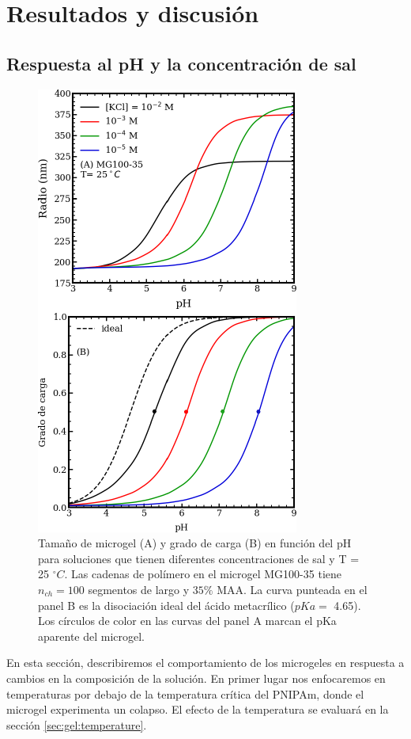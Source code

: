 \section{Resultados y discusi\'on}



\subsection{Respuesta al pH y la concentraci\'on de sal}\label{sec:gel:pH_salt}


\begin{figure}[!ht]
\centering
\includegraphics[width=0.40\linewidth]{Figures/graph-gel/R-pH.pdf}
\caption{Tama\~no de microgel (A) y grado de carga (B) en funci\'on del pH para soluciones que tienen diferentes concentraciones de sal y T = 25 $^\circ C$.
	Las cadenas de pol\'imero en el microgel MG100-35 tiene  $n_{ch}=100$ segmentos de largo y $35\% $ MAA.
	La curva  punteada en el panel B es la disociaci\'on ideal del \'acido metacr\'ilico ($pKa=$ 4.65).
	Los c\'irculos de color en las curvas del panel A marcan el pKa aparente del microgel.}
\label{fig:gel:R-pH}
\end{figure}

En esta secci\'on, describiremos el comportamiento de los microgeles en respuesta a cambios en la composici\'on de la soluci\'on. En primer lugar nos enfocaremos en temperaturas por debajo de la temperatura cr\'itica del PNIPAm, donde el microgel experimenta un colapso. El efecto de la temperatura se evaluar\'a en la secci\'on \ref{sec:gel:temperature}.

